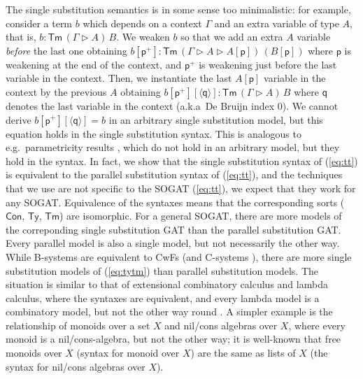 \documentclass[sigplan,10pt,anonymous,review]{acmart}\settopmatter{printfolios=true,printccs=false,printacmref=false}
\newcommand{\Ty}{\mathsf{Ty}}
\newcommand{\Tm}{\mathsf{Tm}}
\newcommand{\Con}{\mathsf{Con}}
\newcommand{\p}{\mathsf{p}}
\newcommand{\q}{\mathsf{q}}
\newcommand{\ext}{\mathop{\triangleright}}
\begin{document}
The single substitution semantics is in some sense
too minimalistic: for example, consider a term $b$ which depends on a
context $\Gamma$ and an extra variable of type $A$, that is, $b :
\Tm\,(\Gamma\ext A)\,B$. We weaken $b$ so that we add an extra $A$
variable \emph{before} the last one obtaining $ b[\p^+] :
\Tm\,(\Gamma\ext A\ext A[\p])\,(B[\p]) $ where $\p$ is weakening at
the end of the context, and $\p^+$ is weakening just before the last
variable in the context. Then, we instantiate the last $A[\p]$
variable in the context by the previous $A$ obtaining
$b[\p^+][\langle\q\rangle] : \Tm\,(\Gamma\ext A)\,B$ where $\q$
denotes the last variable in the context (a.k.a\ De Bruijn index $0$).
We cannot derive $b[\p^+][\langle\q\rangle] = b$ in an arbitrary single substitution
model, but this equation holds in the single substitution syntax.
This is analogous to e.g.\ parametricity results
\cite{DBLP:journals/jfp/BernardyJP12}, which do not hold in an
arbitrary model, but they hold in the syntax. In fact, we show that
the single substitution syntax of (\ref{eq:tt}) is equivalent to the
parallel substitution syntax of (\ref{eq:tt}), and the techniques that
we use are not specific to the SOGAT (\ref{eq:tt}), we expect
that they work for any SOGAT. Equivalence of the syntaxes means that
the corresponding sorts ($\Con$, $\Ty$, $\Tm$) are isomorphic. For a
general SOGAT, there are more models of the correponding single
substitution GAT than the parallel substitution GAT. Every parallel
model is also a single model, but not necessarily the other way. While
B-systems are equivalent to CwFs (and C-systems
\cite{AHRENS_EMMENEGGER_NORTH_RIJKE_2023}), there are more single
substitution models of (\ref{eq:tytm}) than parallel substitution
models. The situation is similar to that of extensional combinatory
calculus and lambda calculus, where the syntaxes are equivalent, and
every lambda model is a combinatory model, but not the other way round
\cite{DBLP:conf/fscd/AltenkirchKSV23}. A simpler example is the
relationship of monoids over a set $X$ and nil/cons algebras over $X$,
where every monoid is a nil/cons-algebra, but not the other way; it is
well-known that free monoids over $X$ (syntax for monoid over $X$) are
the same as lists of $X$ (the syntax for nil/cons algebras over $X$).
\end{document}
